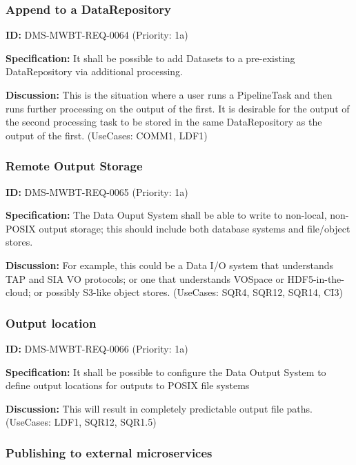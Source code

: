\documentclass[SE,toc,lsstdraft]{lsstdoc}
\begin{document}
\subsubsection{Append to a DataRepository}

\label{DMS-MWBT-REQ-0064}
\textbf{ID:} DMS-MWBT-REQ-0064 (Priority: 1a)

\textbf{Specification:}
It shall be possible to add Datasets to a pre-existing DataRepository via additional processing.

\textbf{Discussion:}
This is the situation where a user runs a PipelineTask and then runs further processing on the output of the first. It is desirable for the output of the second processing task to be stored in the same DataRepository as the output of the first. (UseCases: COMM1, LDF1)

\subsubsection{Remote Output Storage}

\label{DMS-MWBT-REQ-0065}
\textbf{ID:} DMS-MWBT-REQ-0065 (Priority: 1a)

\textbf{Specification:}
The Data Ouput System shall be able to write to non-local, non-POSIX output storage; this should include both database systems and file/object stores.

\textbf{Discussion:}
For example, this could be a Data I/O system that understands TAP and SIA VO protocols; or one that understands VOSpace or HDF5-in-the-cloud; or possibly S3-like object stores. (UseCases: SQR4, SQR12, SQR14, CI3)

\subsubsection{Output location}

\label{DMS-MWBT-REQ-0066}
\textbf{ID:} DMS-MWBT-REQ-0066 (Priority: 1a)

\textbf{Specification:}
It shall be possible to configure the Data Output System to define output locations for outputs to POSIX file systems

\textbf{Discussion:}
This will result in completely predictable output file paths. (UseCases: LDF1, SQR12, SQR1.5)

\subsubsection{Publishing to external microservices}
\end{document}
